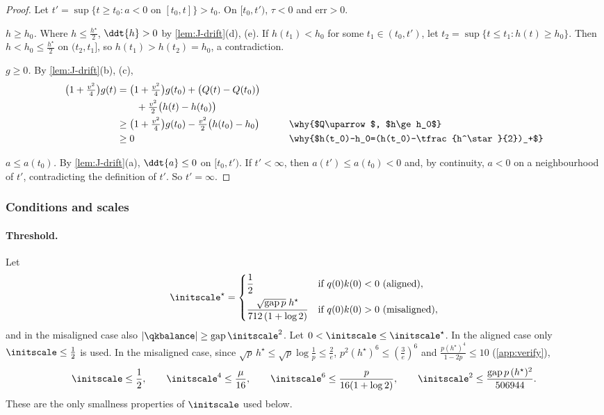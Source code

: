 \begin{proof}
Let $t'=\sup\{t\ge t_0:a<0\text{ on }[t_0,t]\}>t_0$. On $[t_0,t')$, $\tau<0$ and $\mathrm{err}>0$.

\emph{$h\ge h_0$.} Where $h\le\frac{h^\star}{2}$, $\ddt{h}>0$ by \cref{lem:J-drift}(d), (e). If $h(t_1)<h_0$ for some $t_1\in(t_0,t')$, let
$t_2=\sup\{t\le t_1:h(t)\ge h_0\}$. Then $h<h_0\le\frac{h^\star}{2}$ on $(t_2,t_1]$, so $h(t_1)>h(t_2)=h_0$, a contradiction.

\emph{$g\ge0$.} By \cref{lem:J-drift}(b), (c),
\begin{alignat*}{2}
 \bigl(1+\tfrac{v^2}{4}\bigr)g(t)&=\bigl(1+\tfrac{v^2}{4}\bigr)g(t_0)+\bigl(Q(t)-Q(t_0)\bigr) &\qquad&\\
 &\qquad+\tfrac{v^2}{2}\bigl(h(t)-h(t_0)\bigr)\\
 &\ge\bigl(1+\tfrac{v^2}{4}\bigr)g(t_0)-\tfrac{v^2}{2}\bigl(h(t_0)-h_0\bigr) && \why{$Q\uparrow$, $h\ge h_0$}\\
 &\ge0 && \why{$h(t_0)-h_0=(h(t_0)-\tfrac{h^\star}{2})_+$}
\end{alignat*}

\emph{$a\le a(t_0)$.} By \cref{lem:J-drift}(a), $\ddt{a}\le0$ on $[t_0,t')$. If $t'<\infty$, then $a(t')\le a(t_0)<0$ and, by continuity, $a<0$ on a
neighbourhood of $t'$, contradicting the definition of $t'$. So $t'=\infty$.
\end{proof}

\subsubsection{Conditions and scales}
\label{app:J-constants}

\paragraph{Threshold.} Let
\[
 \initscale^\star=\begin{cases}\dfrac{1}{2}&\text{if }q(0)k(0)<0\ \text{(aligned)},\\[8pt]
 \dfrac{\sqrt{\mathrm{gap}\,p}\;h^\star}{712\,(1+\log 2)}&\text{if }q(0)k(0)>0\ \text{(misaligned)},\end{cases}
\]
and in the misaligned case also $|\qkbalance|\ge\mathrm{gap}\,\initscale^2$. Let $0<\initscale\le\initscale^\star$. In the aligned case only $\initscale\le\frac{1}{2}$ is used.
In the misaligned case, since $\sqrt p\,h^\star\le\sqrt p\log\frac{1}{p}\le\frac{2}{e}$, $p^2(h^\star)^6\le(\frac{3}{e})^6$ and $\frac{p(h^\star)^4}{1-2p}\le10$
(\cref{app:verify}),
\begin{equation}
 \initscale\le\frac{1}{2},\qquad \initscale^4\le\frac{\mu}{16},\qquad \initscale^6\le\frac{p}{16(1+\log 2)},\qquad
 \initscale^2\le\frac{\mathrm{gap}\,p\,(h^\star)^2}{506944}.
 \label{eq:J-eps}
\end{equation}
These are the only smallness properties of $\initscale$ used below.

